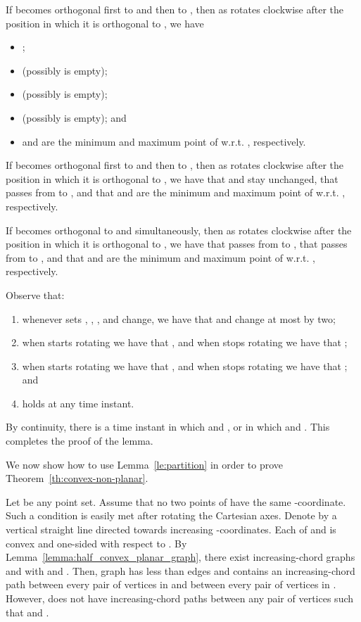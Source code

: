 \documentclass{llncs}
\renewenvironment{proof}
{{\bf Proof:}}{\hspace*{\fill}\par\vspace{2mm}}
\begin{document}
\begin{proof}
If  becomes orthogonal first to  and then to , then as  rotates clockwise after the position in which it is orthogonal to , we have

\begin{itemize}
\item ;
\item  (possibly  is empty);
\item  (possibly  is empty);
\item  (possibly  is empty); and
\item  and  are the minimum and maximum point of  w.r.t. , respectively.
\end{itemize}


If  becomes orthogonal first to  and then to , then as  rotates clockwise after the position in which it is orthogonal to , we have that  and  stay unchanged, that  passes from  to , and that  and  are the minimum and maximum point of  w.r.t. , respectively.


If  becomes orthogonal to  and  simultaneously, then as  rotates clockwise after the position in which it is orthogonal to  , we have that  passes from  to , that  passes from  to , and that  and  are the minimum and maximum point of  w.r.t. , respectively.

Observe that:
\begin{enumerate}
\item whenever sets , , , and  change, we have that  and  change at most by two;
\item when  starts rotating we have that , and when  stops rotating we have that ;
\item when  starts rotating we have that  , and when  stops rotating we have that ; and
\item  holds at any time instant.
\end{enumerate}

By continuity, there is a time instant in which  and , or in which  and . This completes the proof of the lemma.
\end{proof}

We now show how to use Lemma~\ref{le:partition} in order to prove Theorem~\ref{th:convex-non-planar}.

Let  be any point set. Assume that no two points of  have the same -coordinate. Such a condition is easily met after rotating the Cartesian axes. Denote by  a vertical straight line directed towards increasing -coordinates. Each of  and  is convex and one-sided with respect to . By Lemma~\ref{lemma:half_convex_planar_graph}, there exist increasing-chord graphs  and  with  and . Then, graph  has less than  edges and contains an increasing-chord path between every pair of vertices in  and between every pair of vertices in . However,  does not have increasing-chord paths between any pair  of vertices such that  and .
\end{document}

